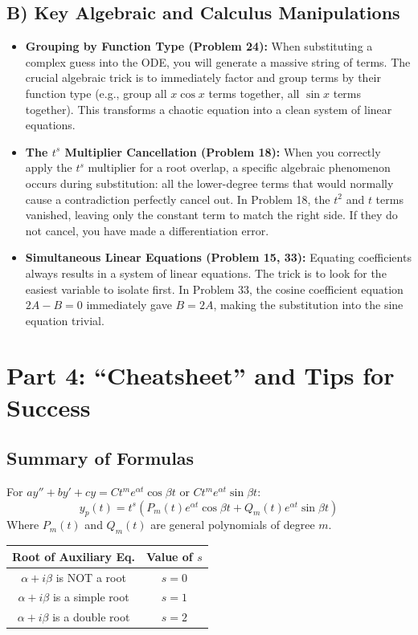 \documentclass[12pt]{article}
\begin{document}
\subsection{B) Key Algebraic and Calculus Manipulations}
\begin{itemize}
    \item \textbf{Grouping by Function Type (Problem 24):} When substituting a complex guess into the ODE, you will generate a massive string of terms. The crucial algebraic trick is to immediately factor and group terms by their function type (e.g., group all $x \cos x$ terms together, all $\sin x$ terms together). This transforms a chaotic equation into a clean system of linear equations.
    \item \textbf{The $t^s$ Multiplier Cancellation (Problem 18):} When you correctly apply the $t^s$ multiplier for a root overlap, a specific algebraic phenomenon occurs during substitution: all the lower-degree terms that would normally cause a contradiction perfectly cancel out. In Problem 18, the $t^2$ and $t$ terms vanished, leaving only the constant term to match the right side. If they do not cancel, you have made a differentiation error.
    \item \textbf{Simultaneous Linear Equations (Problem 15, 33):} Equating coefficients always results in a system of linear equations. The trick is to look for the easiest variable to isolate first. In Problem 33, the cosine coefficient equation $2A - B = 0$ immediately gave $B = 2A$, making the substitution into the sine equation trivial.
\end{itemize}

\newpage
\section{Part 4: ``Cheatsheet'' and Tips for Success}

\subsection{Summary of Formulas}
For $ay'' + by' + cy = C t^m e^{\alpha t} \cos \beta t$ or $C t^m e^{\alpha t} \sin \beta t$:
\[ y_p(t) = t^s \left( P_m(t) e^{\alpha t} \cos \beta t + Q_m(t) e^{\alpha t} \sin \beta t \right) \]
Where $P_m(t)$ and $Q_m(t)$ are general polynomials of degree $m$.
\begin{center}
\begin{tabular}{|c|c|}
\hline
\textbf{Root of Auxiliary Eq.} & \textbf{Value of $s$} \\
\hline
$\alpha + i\beta$ is NOT a root & $s = 0$ \\
$\alpha + i\beta$ is a simple root & $s = 1$ \\
$\alpha + i\beta$ is a double root & $s = 2$ \\
\hline
\end{tabular}
\end{center}
\end{document}
